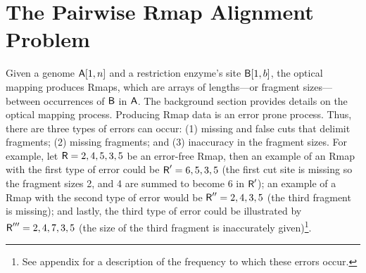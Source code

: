 \section{The Pairwise Rmap Alignment Problem}



Given a genome $\mathsf{A}[1,n]$ and a restriction enzyme's site $\mathsf{B}[1,b]$, the optical mapping produces Rmaps, which are arrays of lengths---or fragment sizes---between occurrences of $\mathsf{B}$ in $\mathsf{A}$. The background section provides details on the optical mapping process.  Producing Rmap data is an error prone process. Thus, there are three types of errors can occur: (1) missing and false cuts that delimit fragments; (2) missing fragments; and (3) inaccuracy in the fragment sizes.  For example, let $\mbox{\rm {\sf R}} = 2,4,5,3,5$ be an error-free Rmap, then an example of an Rmap with the first type of error could be $\mbox{\rm {\sf R}}' = 6,5,3,5$ (the first cut site is missing so the fragment sizes 2, and 4 are summed to become 6 in $\mbox{\rm {\sf R}}'$); an example of a Rmap with the second type of error would be $\mbox{\rm {\sf R}}'' = 2,4,3,5$ (the third fragment is missing); and lastly, the third type of error could be illustrated by $\mbox{\rm {\sf R}}''' = 2,4,7,3,5$ (the size of the third fragment is inaccurately given)\footnote{See appendix for a description of the frequency to which these errors occur.}.


